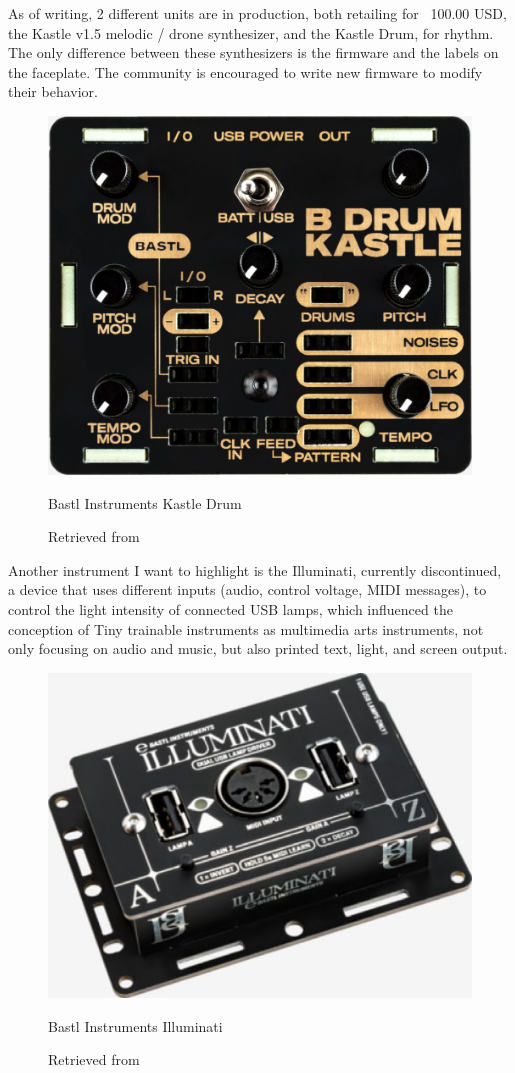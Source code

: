 As of writing, 2 different units are in production, both retailing for ~100.00 USD, the Kastle v1.5 melodic / drone synthesizer, and the Kastle Drum, for rhythm. The only difference between these synthesizers is the firmware and the labels on the faceplate. The community is encouraged to write new firmware to modify their behavior. 

\begin{figure}[ht]
  \centering
  \includegraphics[width=0.75\linewidth,height=0.25\textheight,keepaspectratio]{images/bastl-kastle-drum.jpg}
  \caption{Bastl Instruments Kastle Drum}
  \caption*{Retrieved from \cite{website-bastl-instruments-current}}
  \label{fig:bastl-kastle-drum}
\end{figure}

Another instrument I want to highlight is the Illuminati, currently discontinued, a device that uses different inputs (audio, control voltage, \acrshort{MIDI} messages), to control the light intensity of connected USB lamps, which influenced the conception of Tiny trainable instruments as multimedia arts instruments, not only focusing on audio and music, but also printed text, light, and screen output.

\begin{figure}[ht]
  \centering
  \includegraphics[width=0.75\linewidth,height=0.25\textheight,keepaspectratio]{images/bastl-illuminati.jpg}
  \caption{Bastl Instruments Illuminati}
  \caption*{Retrieved from \cite{website-bastl-instruments-current}}
  \label{fig:bastl-illuminati}
\end{figure}

